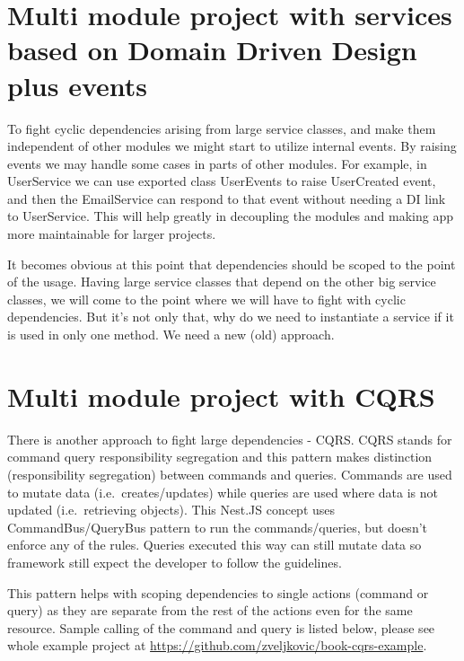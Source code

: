 \section{Multi module project with services based on Domain Driven Design plus events}\label{sec:arch-mm-ddd-events}

To fight cyclic dependencies arising from large service classes, and make them independent of other modules we might
start to utilize internal events.
By raising events we may handle some cases in parts of other modules.
For example, in UserService we can use exported class UserEvents to raise UserCreated event, and then the
EmailService can respond to that event without needing a DI link to UserService.
This will help greatly in decoupling the modules and making app more maintainable for larger projects.

\begin{tcolorbox}[title=Dependency Injection issues]
  It becomes obvious at this point that dependencies should be scoped to the point of the usage.
  Having large service classes that depend on the other big service classes, we will come to the point where we
  will have to fight with cyclic dependencies.
  But it's not only that, why do we need to instantiate a service if it is used in only one method.
  We need a new (old) approach.
\end{tcolorbox}


\section{Multi module project with CQRS}\label{sec:arch-mm-cqrs}

There is another approach to fight large dependencies - CQRS\@.
CQRS stands for command query responsibility segregation and this pattern makes distinction (responsibility segregation)
between commands and queries.
Commands are used to mutate data (i.e.\ creates/updates) while queries are used where data is not updated
(i.e.\ retrieving objects).
This Nest.JS concept uses CommandBus/QueryBus pattern to run the commands/queries, but doesn't enforce any of the rules.
Queries executed this way can still mutate data so framework still expect the developer to follow the guidelines.

This pattern helps with scoping dependencies to single actions (command or query) as they are separate from the
rest of the actions even for the same resource.
Sample calling of the command and query is listed below, please see whole example project at
\href{htthttps://github.com/zveljkovic/book-cqrs-example}{https://github.com/zveljkovic/book-cqrs-example}.

